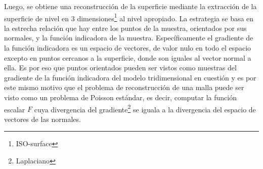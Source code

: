 Luego, se obtiene una reconstrucción de la superficie mediante la extracción de la superficie de nivel en 3 dimensiones\footnote{ISO-surface} al nivel apropiado.
La estrategia se basa en la estrecha relación que hay entre los puntos de la muestra, orientados por sus normales, y la función indicadora de la muestra. Específicamente el gradiente de la función indicadora es un espacio de vectores, de valor nulo en todo el espacio excepto en puntos cercanos a la superficie, donde son iguales al vector normal a ella.
Es por eso que puntos orientados pueden ser vistos como muestras del gradiente de la función indicadora del modelo tridimensional en cuestión y es por este mismo motivo que el problema de reconstrucción de una malla puede ser visto como un problema de Poisson estándar, es decir, computar la función escalar $F$ cuya divergencia del gradiente\footnote{Laplaciano} se iguala a la divergencia del espacio de vectores de las normales.

